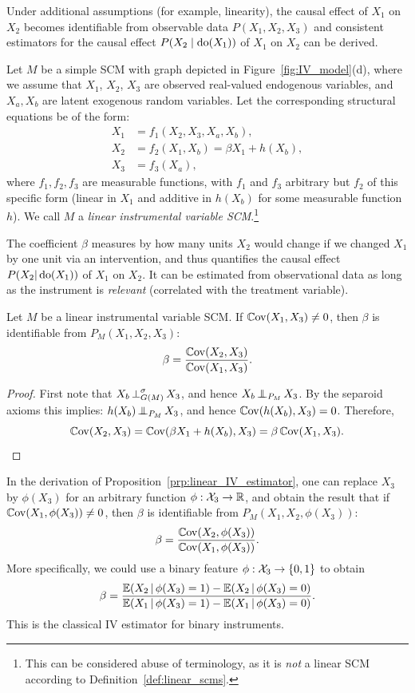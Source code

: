 Under additional assumptions (for example, linearity), the causal effect of $X_1$ on $X_2$ becomes identifiable from observable data $P(X_1,X_2,X_3)$ and consistent estimators for the causal effect $P(X_2 \mid \operatorname{do}(X_1))$ of $X_1$ on $X_2$ can be derived. 
\begin{Def}\label{def:linear_IV}
Let $M$ be a simple SCM with graph depicted in Figure~\ref{fig:IV_model}(d), where we assume that $X_1$, $X_2$, $X_3$ are observed real-valued endogenous variables, and $X_a, X_b$ are latent exogenous random variables.
Let the corresponding structural equations be of the form:
\begin{align*}
  X_1 &= f_1(X_2,X_3,X_a,X_b), \\
  X_2 &= f_2(X_1,X_b) = \beta X_1 + h(X_b), \\
  X_3 &= f_3(X_a), 
\end{align*}
where $f_1,f_2,f_3$ are measurable functions, with $f_1$ and $f_3$ arbitrary but $f_2$ of this specific form (linear in $X_1$ and additive in $h(X_b)$ for some measurable function $h$).
We call $M$ a \emph{linear instrumental variable SCM}.\footnote{This can be considered abuse of terminology, as it is \emph{not} a linear SCM according to Definition~\ref{def:linear_scms}.}
\end{Def}
The coefficient $\beta$ measures by how many units $X_2$ would change if we changed $X_1$ by one unit via an intervention, and thus quantifies the causal effect $P(X_2|\operatorname{do}(X_1))$ of $X_1$ on $X_2$.
It can be estimated from observational data as long as the instrument is \emph{relevant} (correlated with the treatment variable).
\begin{Prp}\label{prp:linear_IV_estimator}
  Let $M$ be a linear instrumental variable SCM. 
  If $\mathbb{C}\mathrm{ov}(X_1,X_3) \neq 0$, then $\beta$ is identifiable from $P_M(X_1,X_2,X_3)$:
    $$\beta = \frac{\mathbb{C}\mathrm{ov}(X_2,X_3)}{\mathbb{C}\mathrm{ov}(X_1,X_3)}.$$
\end{Prp}
\begin{proof}
First note that $X_b \operatorname*{\perp}^{\sigma}_{G(M)} X_3$, and hence $X_b \operatorname*{\perp\mkern-11mu\perp}_{P_M} X_3$.
By the separoid axioms this implies: $h(X_b) \operatorname*{\perp\mkern-11mu\perp}_{P_M} X_3$, and hence $\mathbb{C}\mathrm{ov}(h(X_b),X_3) = 0$.
Therefore,
$$ \mathbb{C}\mathrm{ov}(X_2,X_3) = \mathbb{C}\mathrm{ov}(\beta  X_1 + h(X_b),X_3) = \beta \,\mathbb{C}\mathrm{ov}(X_1,X_3).$$
\end{proof}
\begin{Rem}
In the derivation of Proposition~\ref{prp:linear_IV_estimator}, one can replace $X_3$ by $\phi(X_3)$ for an arbitrary function $\phi : \mathcal{X}_3 \to \mathbb{R}$, and obtain the result that
if $\mathbb{C}\mathrm{ov}(X_1,\phi(X_3)) \neq 0$, then $\beta$ is identifiable from $P_M(X_1,X_2,\phi(X_3))$:
  $$\beta = \frac{\mathbb{C}\mathrm{ov}(X_2,\phi(X_3))}{\mathbb{C}\mathrm{ov}(X_1,\phi(X_3))}.$$
More specifically, we could use a binary feature $\phi : \mathcal{X}_3 \to \{0,1\}$ to obtain
  $$\beta = \frac{\mathbb{E}(X_2 \operatorname*{|} \phi(X_3)=1) - \mathbb{E}(X_2 \operatorname*{|} \phi(X_3)=0)}{\mathbb{E}(X_1 \operatorname*{|} \phi(X_3)=1) - \mathbb{E}(X_1 \operatorname*{|} \phi(X_3)=0)}.$$
This is the classical IV estimator for binary instruments.
\end{Rem}

